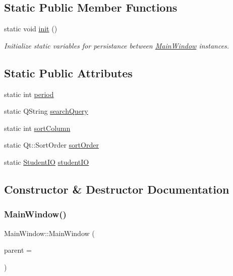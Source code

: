 \subsection*{Static Public Member Functions}
\begin{DoxyCompactItemize}
\item 
static void \hyperlink{class_main_window_a671e7e5b0a3a7a3fb1cf44c5c8377952}{init} ()
\begin{DoxyCompactList}\small\item\em Initialize static variables for persistance between \hyperlink{class_main_window}{Main\+Window} instances. \end{DoxyCompactList}\end{DoxyCompactItemize}
\subsection*{Static Public Attributes}
\begin{DoxyCompactItemize}
\item 
static int \hyperlink{class_main_window_a56d4e25cc4671e1e91159108ce7f0236}{period}
\item 
static Q\+String \hyperlink{class_main_window_a64b89cae1484c9d1d142cba5ff644204}{search\+Query}
\item 
static int \hyperlink{class_main_window_ad79ea8b796bf0a5fb50b8caecdc9b86d}{sort\+Column}
\item 
static Qt\+::\+Sort\+Order \hyperlink{class_main_window_a358b98f0f9644adb5404c7c78ecf5216}{sort\+Order}
\item 
static \hyperlink{class_student_i_o}{Student\+IO} \hyperlink{class_main_window_a74de1d8e782ff9db114cdd50956252b3}{student\+IO}
\end{DoxyCompactItemize}


\subsection{Constructor \& Destructor Documentation}
\mbox{\label{class_main_window_a8b244be8b7b7db1b08de2a2acb9409db}} 
\subsubsection{\texorpdfstring{Main\+Window()}{MainWindow()}}
{\footnotesize\ttfamily Main\+Window\+::\+Main\+Window (\begin{DoxyParamCaption}\item[{Q\+Widget $\ast$}]{parent = {} }\end{DoxyParamCaption})\hspace{0.3cm}{\ttfamily [explicit]}}



